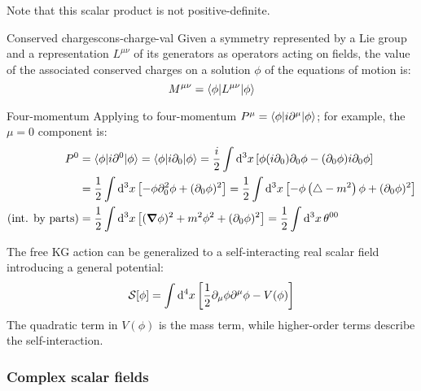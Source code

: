 Note that this scalar product is not positive-definite.

\begin{theorem}{Conserved charges}{cons-charge-val}
  Given a symmetry represented by a Lie group and a representation $ L^{\mu \nu} $ of its generators as operators acting on fields, the value of the associated conserved charges on a solution $ \phi $ of the equations of motion is:
  \begin{equation}
    M^{\mu \nu} = \braket{\phi | L^{\mu \nu} | \phi}
  \end{equation}
\end{theorem}

\begin{example}{Four-momentum}{}
  Applying  to four-momentum $ P^\mu = \braket{\phi | i \partial^\mu | \phi} $; for example, the $ \mu = 0 $ component is:
  \begin{equation*}
    \begin{split}
      P^0 &= \braket{\phi | i \partial^0 | \phi} = \braket{\phi | i \partial_0 | \phi} = \frac{i}{2} \int \mathrm{d}^3 x \left[ \phi (i \partial_0) \partial_0 \phi - (\partial_0 \phi) i \partial_0 \phi \right] \\
          &= \frac{1}{2} \int \mathrm{d}^3 x \left[ - \phi \partial_0^2 \phi + (\partial_0 \phi)^2 \right] = \frac{1}{2} \int \mathrm{d}^3 x \left[ - \phi \left( \triangle - m^2 \right) \phi + (\partial_0 \phi)^2 \right] \\
      (\text{int. by parts}) &= \frac{1}{2} \int \mathrm{d}^3 x \left[ (\boldsymbol{\nabla} \phi)^2 + m^2 \phi^2 + (\partial_0 \phi)^2 \right] = \frac{1}{2} \int \mathrm{d}^3 x\, \theta^{00}
    \end{split}
  \end{equation*}
\end{example}

The free KG action can be generalized to a self-interacting real scalar field introducing a general potential:
\begin{equation}
  \mathcal{S}[\phi] = \int \mathrm{d}^4 x \left[ \frac{1}{2} \partial_\mu \phi \partial^\mu \phi - V(\phi) \right]
\end{equation}
The quadratic term in $ V(\phi) $ is the mass term, while higher-order terms describe the self-interaction.

\subsubsection{Complex scalar fields}

